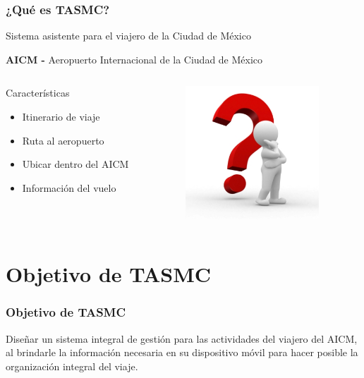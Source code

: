 \documentclass[12pt]{beamer}
\begin{document}
\begin{frame}[c]
	\frametitle{¿Qué es TASMC?}
	\begin{block}{}
		Sistema asistente para el viajero de la Ciudad de México
	\end{block}
	\begin{block}{}
	 	\textbf{AICM - } Aeropuerto Internacional de la Ciudad de México
	\end{block}
	\begin{columns} 
		\begin{column}{5cm}
			\begin{block}{Características} \small 
				\begin{itemize}
					\item Itinerario de viaje
					\item Ruta al aeropuerto
					\item Ubicar dentro del AICM
					\item Información del vuelo
				\end{itemize} 
			\end{block} 
		\end{column}
		\begin{column}{4cm} 
			\begin{center}
				\includegraphics[height=5cm]{imagenes/queEs.jpg}
			\end{center} 
		\end{column} 
	\end{columns}
\end{frame}

\section{Objetivo de TASMC}
\begin{frame}
	\frametitle{Objetivo de TASMC}
	\begin{block}{}
		\justifying
		Diseñar un sistema integral de gestión para las actividades del viajero del AICM, 
		al brindarle la información necesaria en su dispositivo móvil para hacer posible la 
		organización integral del viaje.
	\end{block}
\end{frame}
\end{document}

